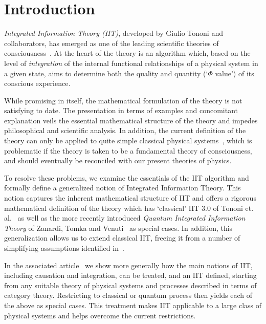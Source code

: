 \section{Introduction}

\emph{Integrated Information Theory (IIT)}, developed by Giulio Tononi and collaborators, has emerged as one of the leading scientific theories of consciousness~\cite{oizumi2014phenomenology,marshall2016integrated,tononi2016integrated,mayner2018pyphi,koch2016neural}. At the heart of the theory is an algorithm which, based on the level of \emph{integration} of the internal functional relationships of a physical system in a given state, aims to determine both the quality and quantity (`$\Phi$ value') of its conscious experience.


While promising in itself, the mathematical formulation of the theory is not satisfying to date. The presentation in terms of examples and concomitant explanation veils the essential mathematical structure of the theory and impedes philosophical and scientific analysis. In addition, the current definition of the theory can only be applied to quite simple classical physical systems~\cite{Barrett.2014}, which is problematic if the theory is taken to be a fundamental theory of consciousness, and should eventually be reconciled with our present theories of physics.

To resolve these problems, we examine the essentials of the IIT algorithm and formally define a generalized notion of Integrated Information Theory.
This notion captures the inherent mathematical structure of IIT and offers a rigorous mathematical definition of the theory which has `classical' IIT 3.0 of Tononi et. al.~\cite{oizumi2014phenomenology, marshall2016integrated,mayner2018pyphi} as well as the more recently introduced \emph{Quantum Integrated Information Theory} of Zanardi, Tomka and Venuti~\cite{zanardi2018quantum} as special cases. In addition, this generalization allows us to extend classical IIT, freeing it from a number of simplifying assumptions identified in~\cite{BarrettMediano.2019}.

In the associated article~\cite{IITProcess} we show more generally how the main notions of IIT, including causation and integration, can be treated, and an IIT defined, starting from any suitable theory of physical systems and processes described in terms of category theory. Restricting to classical or quantum process then yields each of the above as special cases. This treatment makes IIT applicable to a large class of physical systems and helps overcome the current restrictions.

